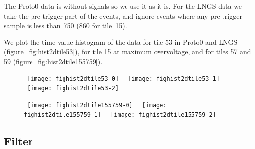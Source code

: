 
The Proto0 data is without signals so we use it as it is. For the LNGS data
we take the pre-trigger part of the events, and ignore events where any
pre-trigger sample is less than~750 (860 for tile~15).

We plot the time-value histogram of the data for tile 53 in Proto0 and LNGS
(figure~\ref{fig:hist2dtile53}), for tile 15 at maximum overvoltage, and for
tiles 57 and 59 (figure~\ref{fig:hist2dtile155759}).


\begin{figure}
    
    \mbox{
    \hspace{-0.20\textwidth}
    \texttt{[image: fighist2dtile53-0]}
    }
    \mbox{
    \hspace{-0.20\textwidth}
    \texttt{[image: fighist2dtile53-1]}
    }
    \mbox{
    \hspace{-0.20\textwidth}
    \texttt{[image: fighist2dtile53-2]}
    }
    
    
\end{figure}

\begin{figure}
    
    \mbox{
    \hspace{-0.20\textwidth}
    \texttt{[image: fighist2dtile155759-0]}
    }
    \mbox{
    \hspace{-0.20\textwidth}
    \texttt{[image: fighist2dtile155759-1]}
    }
    \mbox{
    \hspace{-0.20\textwidth}
    \texttt{[image: fighist2dtile155759-2]}
    }

    
\end{figure}

\subsection{Filter}

